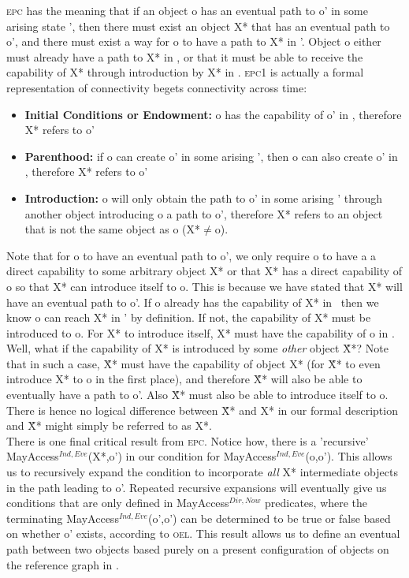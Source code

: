 \documentclass[a4paper,11pt, twoside,twocolumn]{article}
\newcommand{\loneq} {$\neq$}
\newcommand{\losigma}{\text{$\upsigma$}}
\begin{document}
\textsc{epc} has the meaning that if an object o has an eventual path to o' in some arising state \losigma', then there must exist an object X* that has an eventual path to o', and there must exist a way for o to have a path to X* in \losigma'. Object o either must already have a path to X* in \losigma, or that it must be able to receive the capability of X* through introduction by X* in \losigma. \textsc{epc1} is actually a formal representation of connectivity begets connectivity across time:

\begin{itemize}
\item \textbf{Initial Conditions or Endowment:} o has the capability of o' in \losigma, therefore X* refers to o'
\item \textbf{Parenthood:} if o can create o' in some arising \losigma', then o can also create o' in \losigma, therefore X* refers to o'
\item \textbf{Introduction:} o will only obtain the path to o' in some arising \losigma' through another object introducing o a path to o', therefore X* refers to an object that is not the same object as o (X*\loneq o). 
\end{itemize}

Note that for o to have an eventual path to o', we only require o to have a a direct capability to some arbitrary object X* or that X* has a direct capability of o so that X* can introduce itself to o. This is because we have stated that X* will have an eventual path to o'. If o already has the capability of X* in \losigma\ then we know o can reach X* in \losigma' by definition. If not, the capability of X* must be introduced to o. For X* to introduce itself, X* must have the capability of o in \losigma.\\

Well, what if the capability of X* is introduced by some \textit{other} object \~X*? Note that in such a case, \~X* must have the capability of object X* (for \~X* to even introduce X* to o in the first place), and therefore \~X* will also be able to eventually have a path to o'. Also \~X* must also be able to introduce itself to o. There is hence no logical difference between \~X* and X* in our formal description and \~X* might simply be referred to as X*.\\

There is one final critical result from \textsc{epc}.
Notice how, there is a 'recursive' MayAccess$^{Ind,Eve}$(X*,o') in our condition for MayAccess$^{Ind,Eve}$(o,o').
This allows us to recursively expand the condition to incorporate \textit{all} X* intermediate objects in the path leading to o'. Repeated recursive expansions will eventually give us conditions that are only defined in MayAccess$^{Dir,Now}$ predicates, where the terminating MayAccess$^{Ind,Eve}$(o',o') can be determined to be true or false based on whether o' exists, according to \textsc{oel}. This result allows us to define an eventual path between two objects based purely on a present configuration of objects on the reference graph in \losigma.\\
\end{document}
